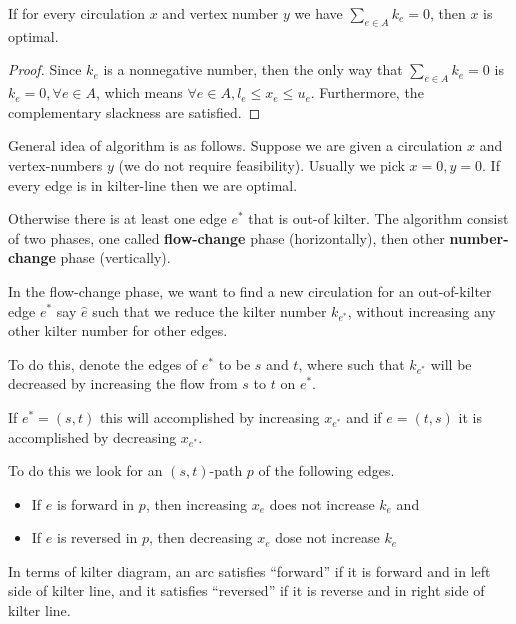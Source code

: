             \begin{lemma}
                If for every circulation $x$ and vertex number $y$ we have $\sum_{e \in A} k_e = 0$, then $x$ is optimal.
            \end{lemma}

            \begin{proof}
                Since $k_e$ is a nonnegative number, then the only way that $\sum_{e \in A} k_e = 0$ is $k_e = 0, \forall e\in A$, which means $\forall e\in A, l_e \le x_e \le u_e$. Furthermore, the complementary slackness are satisfied.
            \end{proof}

            General idea of algorithm is as follows. Suppose we are given a circulation $x$ and vertex-numbers $y$ (we do not require feasibility). Usually we pick $x=0, y=0$. If every edge is in kilter-line then we are optimal.

            Otherwise there is at least one edge $e^*$ that is out-of kilter. The algorithm consist of two phases, one called \textbf{flow-change} phase (horizontally), then other \textbf{number-change} phase (vertically).

            In the flow-change phase, we want to find a new circulation for an out-of-kilter edge $e^*$ say $\hat{e}$ such that we reduce the kilter number $k_{e^*}$, without increasing any other kilter number for other edges.

            To do this, denote the edges of $e^*$ to be $s$ and $t$, where such that $k_{e^*}$ will be decreased by increasing the flow from $s$ to $t$ on $e^*$.

            If $e^*=(s, t)$ this will accomplished by increasing $x_{e^*}$ and if $e=(t, s)$ it is accomplished by decreasing $x_{e^*}$. 

            To do this we look for an $(s, t)$-path $p$ of the following edges.

            \begin{itemize}
                \item If $e$ is forward in $p$, then increasing $x_e$ does not increase $k_e$ and
                \item If $e$ is reversed in $p$, then decreasing $x_e$ dose not increase $k_e$
            \end{itemize}

            In terms of kilter diagram, an arc satisfies ``forward'' if it is forward and in left side of kilter line, and it satisfies ``reversed'' if it is reverse and in right side of kilter line.

